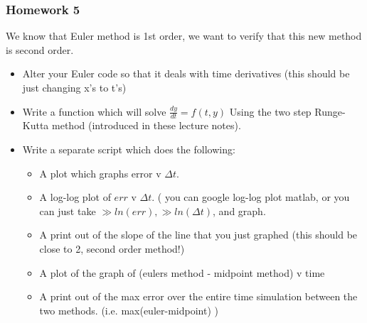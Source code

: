 \documentclass{beamer}
\begin{document}
\begin{frame}
\frametitle{Homework 5} 
We know that Euler method is 1st order, we want to verify that this new method is second order. 
\begin{itemize}
\item Alter your Euler code so that it deals with time derivatives (this should be just changing x's to t's) 
\item Write a function which will solve $ \frac{dy}{dt} = f(t,y)$ Using the two step Runge-Kutta method (introduced in these lecture notes).
\item Write a separate script which does the following: 
\begin{itemize}
\item A plot which graphs error v $\Delta t$. 
\item A log-log  plot of $ err$ v $\Delta t$. ( you can google log-log plot matlab, or you can just take $\gg ln(err), \gg ln(\Delta t)$, and graph.
\item A print out of the slope of the line that you just graphed (this should be close to 2, second order method!)
\item A plot of the graph of (eulers method - midpoint method) v time
\item A print out of the max error over the entire time simulation between the two methods. (i.e. max(euler-midpoint) )
\end{itemize}
\end{itemize}
\end{frame}

%
\end{document}

